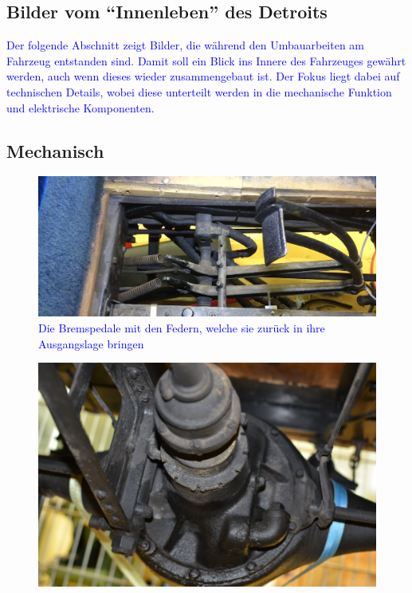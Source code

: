 \begin{landscape}\chapter{Bilder vom "`Innenleben"' des Detroits}

\textcolor{blue}{Der folgende Abschnitt zeigt Bilder, die während den Umbauarbeiten am Fahrzeug entstanden sind. Damit soll ein Blick ins Innere des Fahrzeuges gewährt werden, auch wenn dieses wieder zusammengebaut ist. Der Fokus liegt dabei auf technischen Details, wobei diese unterteilt werden in die mechanische Funktion und elektrische Komponenten.}


\section{Mechanisch}
\begin{figure}[h]
	\centering
		\includegraphics[width=1.30\textwidth]{images/Anhang/Bremspedale.jpg}
	\caption{\textcolor{blue}{Die Bremspedale mit den Federn, welche sie zurück in ihre Ausgangslage bringen}}
	\label{fig:Bremspedale}
\end{figure}
\begin{figure}[h]
	\centering
		\includegraphics[width=1.30\textwidth]{images/Anhang/Differential.jpg}

\end{figure}
\end{landscape}
